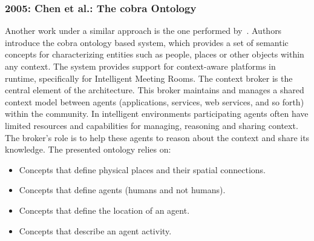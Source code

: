 \subsubsection{2005: Chen et al.: The \ac{cobra} Ontology}
\label{sec:gu}

Another work under a similar approach is the one performed by~\citet{chen_using_2005}.
Authors introduce the \acf{cobra} ontology based system, which provides a set of 
semantic concepts for characterizing entities such as people, places or other 
objects within any context. The system provides support for context-aware 
platforms in runtime, specifically for Intelligent Meeting Rooms. The context 
broker is the central element of the architecture. This broker maintains and 
manages a shared context model between agents (applications, services, web 
services, and so forth) within the community. In intelligent environments participating
agents often have limited resources and capabilities for managing, reasoning and
sharing context. The broker's role is to help these agents to reason about the
context and share its knowledge. The presented ontology relies on:

\begin{itemize}
  \item Concepts that define physical places and their spatial connections.
  \item Concepts that define agents (humans and not humans).
  \item Concepts that define the location of an agent.
  \item Concepts that describe an agent activity.
\end{itemize}